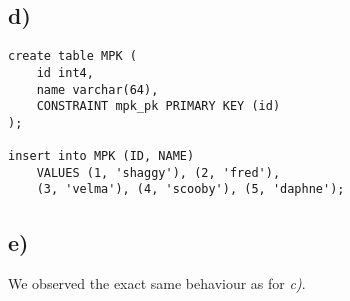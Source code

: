 \documentclass[a4paper,english,abstract=on]{scrartcl}
\begin{document}
\subsection*{d)}
\begin{lstlisting}
create table MPK (
	id int4,
	name varchar(64),
	CONSTRAINT mpk_pk PRIMARY KEY (id)
);

insert into MPK (ID, NAME) 
	VALUES (1, 'shaggy'), (2, 'fred'), 
	(3, 'velma'), (4, 'scooby'), (5, 'daphne');
\end{lstlisting}

\subsection*{e)}
We observed the exact same behaviour as for \textit{c)}.
\end{document}
